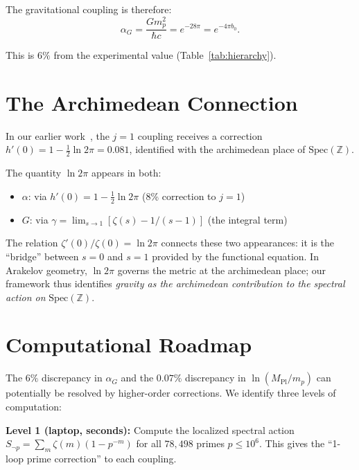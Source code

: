 \documentclass[aps,prl,twocolumn,superscriptaddress,nofootinbib]{revtex4-2}
\newcommand{\Spec}{\mathrm{Spec}}
\begin{document}
The gravitational coupling is therefore:
\begin{equation}\label{eq:alphaG}
  \alpha_G = \frac{Gm_p^2}{\hbar c}
  = e^{-28\pi} = e^{-4\pi b_0}.
\end{equation}

This is $6\%$ from the experimental value (Table~\ref{tab:hierarchy}).

\section{The Archimedean Connection}

In our earlier work~\cite{WB_arithmetic}, the $j=1$ coupling
receives a correction $h'(0)=1-\frac{1}{2}\ln 2\pi=0.081$,
identified with the archimedean place of $\Spec(\mathbb{Z})$.

The quantity $\ln 2\pi$ appears in both:
\begin{itemize}
\item $\alpha$: via $h'(0)=1-\frac{1}{2}\ln 2\pi$ (8\% correction to $j=1$)
\item $G$: via $\gamma=\lim_{s\to 1}[\zeta(s)-1/(s{-}1)]$ (the integral term)
\end{itemize}

The relation $\zeta'(0)/\zeta(0)=\ln 2\pi$ connects these two
appearances: it is the ``bridge'' between $s=0$ and $s=1$ provided
by the functional equation.  In Arakelov geometry, $\ln 2\pi$
governs the metric at the archimedean place; our framework thus
identifies \emph{gravity as the archimedean contribution to the
spectral action on} $\Spec(\mathbb{Z})$.

\section{Computational Roadmap}

The $6\%$ discrepancy in $\alpha_G$ and the $0.07\%$ discrepancy
in $\ln(M_{\mathrm{Pl}}/m_p)$ can potentially be resolved by
higher-order corrections.  We identify three levels of computation:

\medskip
\noindent\textbf{Level 1 (laptop, seconds):} Compute the localized
spectral action $S_{\neg p}=\sum_m\zeta(m)(1{-}p^{-m})$ for all
$78{,}498$ primes $p\leq 10^6$.  This gives the ``1-loop prime
correction'' to each coupling.
\end{document}
